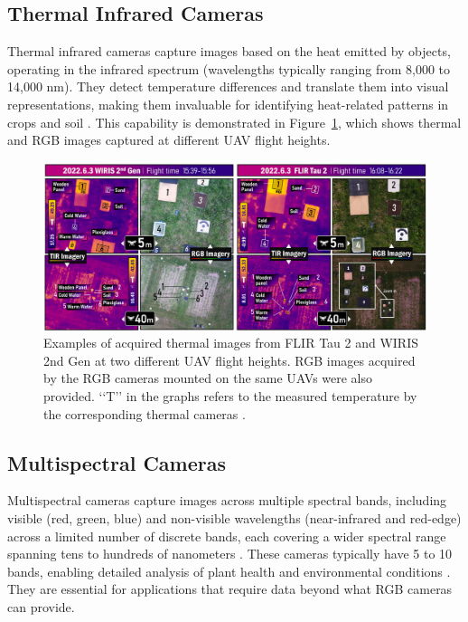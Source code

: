 \subsection{Thermal Infrared Cameras}

Thermal infrared cameras capture images based on the heat emitted by objects, operating in the infrared spectrum (wavelengths typically ranging from 8,000 to 14,000 nm). They detect temperature differences and translate them into visual representations, making them invaluable for identifying heat-related patterns in crops and soil \parencite{delavarpour2021technical}. This capability is demonstrated in Figure~\ref{fig:thermalimages}, which shows thermal and RGB images captured at different UAV flight heights.


\begin{figure}[H]
    \centering
    \includegraphics[width=0.8
    \textwidth]{chapters/chapter3/images/Figure04.png}
    \caption{Examples of acquired thermal images from FLIR Tau 2 and WIRIS 2nd Gen at two different UAV flight heights. RGB images acquired by the RGB cameras mounted on the same UAVs were also provided. ‘‘T’’ in the graphs refers to the measured temperature by the corresponding thermal cameras \protect\parencite{wan2024optimizing}.}
    \label{fig:thermalimages}
\end{figure}


\subsection{Multispectral Cameras}

Multispectral cameras capture images across multiple spectral bands, including visible (red, green, blue) and non-visible wavelengths (near-infrared and red-edge) across a limited number of discrete bands, each covering a wider spectral range spanning tens to hundreds of nanometers \parencite{lu2020recent}. These cameras typically have 5 to 10 bands, enabling detailed analysis of plant health and environmental conditions \parencite{delavarpour2021technical}. They are essential for applications that require data beyond what RGB cameras can provide.

